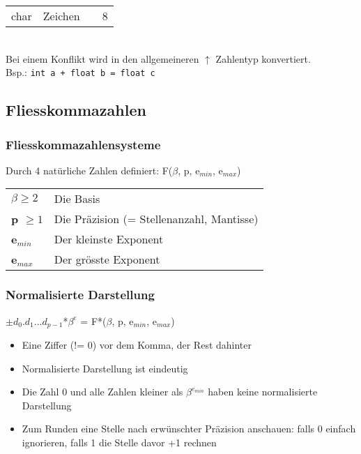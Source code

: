 \documentclass[a3paper, 10pt, landscape]{scrartcl}
\newcommand{\code}[1]{\texttt{#1}}
\begin{document}
\begin{multicols*}{3}
\begin{tabular} {l l c l}
			char & Zeichen & & 8 \\
			
			
			
			\end{tabular}\\
			
			Bei einem Konflikt wird in den allgemeineren $\uparrow$ Zahlentyp konvertiert.\\
			Bsp.: \code{int a + float b = float c}
			\vspace{0.1cm}
		
		\subsection{Fliesskommazahlen}
		
		\subsubsection{Fliesskommazahlensysteme}
		\vspace{0.1cm}
		Durch 4 natürliche Zahlen definiert: F($\beta$, p, e$_{min}$, e$_{max}$) \\
		\begin{tabular}{l l}
			\textbf{$\beta\geq2$} & Die Basis \\
			\textbf{p $\geq1$} & Die Präzision (= Stellenanzahl, Mantisse) \\
			\textbf{e$_{min}$} & Der kleinste Exponent \\
			\textbf{e$_{max}$} & Der grösste Exponent
		\end{tabular}
		
		\subsubsection{Normalisierte Darstellung}
		
		\centerline{$\pm d_0$.$d_1$...$d_{p-1}$*$\beta^e$ = F*($\beta$, p, e$_{min}$, e$_{max}$)}
		\begin{itemize}
			\item Eine Ziffer (!= 0) vor dem Komma, der Rest dahinter
			\item Normalisierte Darstellung ist eindeutig
			\item Die Zahl 0 und alle Zahlen kleiner als $\beta^{e_{min}}$ haben keine normalisierte Darstellung
			\item Zum Runden eine Stelle nach erwünschter Präzision anschauen: falls 0 einfach ignorieren, falls 1 die Stelle davor +1 rechnen
		\end{itemize}
		

\end{multicols*}
\end{document}
